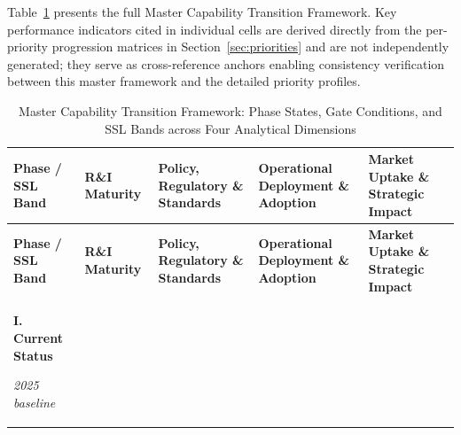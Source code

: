 Table~\ref{tab:master_transition} presents the full Master Capability
Transition Framework. Key performance indicators cited in individual cells
are derived directly from the per-priority progression matrices in
Section~\ref{sec:priorities} and are not independently generated; they
serve as cross-reference anchors enabling consistency verification between
this master framework and the detailed priority profiles.

\newpage

\begingroup
\setlength{\LTleft}{0pt}
\setlength{\LTright}{0pt}
\scriptsize
\begin{longtable}{|p{1.7cm}|p{2.2cm}|p{2.2cm}|p{2.2cm}|p{2.2cm}|}
\caption{Master Capability Transition Framework: Phase States, Gate
Conditions, and SSL Bands across Four Analytical Dimensions}
\label{tab:master_transition} \\
\hline
\rowcolor{white}
\textbf{Phase / SSL Band} &
\textbf{R\&I Maturity} &
\textbf{Policy, Regulatory \& Standards} &
\textbf{Operational Deployment \& Adoption} &
\textbf{Market Uptake \& Strategic Impact} \\
\hline
\endfirsthead
\hline
\rowcolor{white}
\textbf{Phase / SSL Band} &
\textbf{R\&I Maturity} &
\textbf{Policy, Regulatory \& Standards} &
\textbf{Operational Deployment \& Adoption} &
\textbf{Market Uptake \& Strategic Impact} \\
\hline
\endhead

\rowcolor{currentrow}
\textbf{I. Current Status}

\smallskip
\textit{2025 baseline}


\end{longtable}
